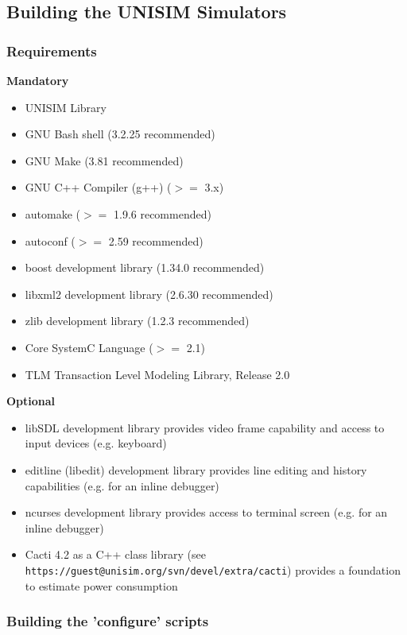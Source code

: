\subsection{Building the UNISIM Simulators}

\subsubsection{Requirements}

\noindent \textbf{Mandatory}

\begin{itemize}
\item UNISIM Library
\item GNU Bash shell (3.2.25 recommended)
\item GNU Make (3.81 recommended)
\item GNU C++ Compiler (g++) ($>=$ 3.x)
\item automake ($>=$ 1.9.6 recommended)
\item autoconf ($>=$ 2.59 recommended)
\item boost development library (1.34.0 recommended)
\item libxml2 development library (2.6.30 recommended)
\item zlib development library (1.2.3 recommended)
\item Core SystemC Language ($>=$ 2.1)
\item TLM Transaction Level Modeling Library, Release 2.0
\end{itemize}

\noindent \textbf{Optional}

\begin{itemize}
\item libSDL development library provides video frame capability and access to input devices (e.g. keyboard)
\item editline (libedit) development library provides line editing and history capabilities (e.g. for an inline debugger)
\item ncurses development library provides access to terminal screen (e.g. for an inline debugger)
\item Cacti 4.2 as a C++ class library (see \texttt{https://guest@unisim.org/svn/devel/extra/cacti}) provides a foundation to estimate power consumption
\end{itemize}

\subsubsection{Building the 'configure' scripts}

